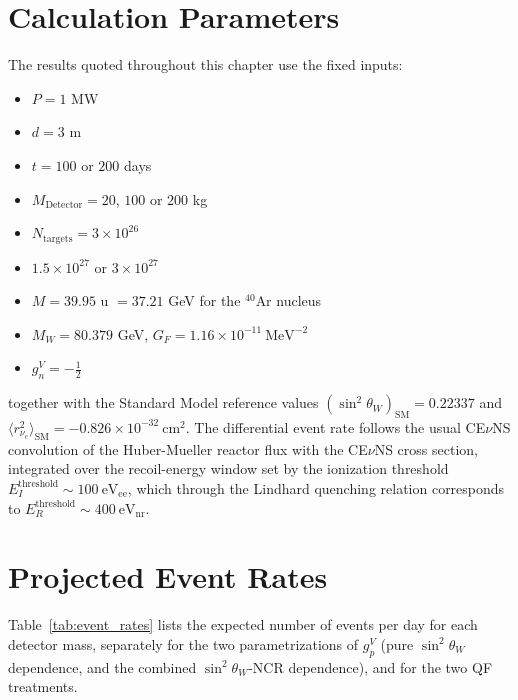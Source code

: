 \section{Calculation Parameters}
The results quoted throughout this chapter use the fixed inputs:
\begin{itemize}
\item $P = 1$ MW 
\item $d = 3$ m 
\item $t = 100$ or $200$ days 
\item $M_{\text{Detector}} = 20$, $100$ or $200$ kg 
\item $N_{\text{targets}} = 3\times10^{26}$ 
\item $1.5\times10^{27}$ or $3\times10^{27}$ 
\item $M = 39.95$ u $= 37.21$ GeV for the $^{40}$Ar nucleus 
\item $M_W = 80.379$ GeV, $G_F = 1.16\times10^{-11}\ \text{MeV}^{-2}$ 
\item $g_n^V = -\tfrac{1}{2}$ 
\end{itemize}
together with the Standard Model reference values $\left(\sin^2\theta_W\right)_{\text{SM}} = 0.22337$ and $\langle r_{\nu_e}^2\rangle_{\text{SM}} = -0.826\times10^{-32}\ \text{cm}^2$. The differential event rate follows the usual CE$\nu$NS convolution of the Huber-Mueller reactor flux with the CE$\nu$NS cross section, integrated over the recoil-energy window set by the ionization threshold $E_{I}^{\text{threshold}} \sim 100\ \text{eV}_{\text{ee}}$, which through the Lindhard quenching relation corresponds to $E_{R}^{\text{threshold}} \sim 400\ \text{eV}_{\text{nr}}$.

\section{Projected Event Rates}
Table~\ref{tab:event_rates} lists the expected number of events per day for each detector mass, separately for the two parametrizations of $g_p^V$ (pure $\sin^2\theta_W$ dependence, and the combined $\sin^2\theta_W$-NCR dependence), and for the two QF treatments.

